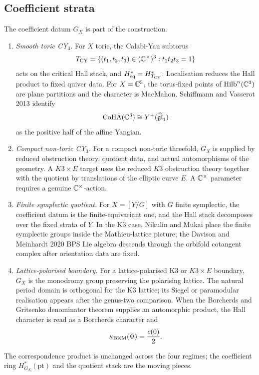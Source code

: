 \subsection*{Coefficient strata}

The coefficient datum $G_X$ is part of the construction.
\begin{enumerate}
\item \emph{Smooth toric CY$_3$.}
For $X$ toric, the Calabi-Yau subtorus
\[
  T_{\mathrm{CY}}
  =
  \{(t_1,t_2,t_3)\in(\mathbb{C}^\times)^3: t_1t_2t_3=1\}
\]
acts on the critical Hall stack, and
$H^{*}_{\mathrm{eq}} = H^{*}_{T_{\mathrm{CY}}}$.  Localisation reduces the Hall product
to fixed quiver data.  For $X=\mathbb{C}^3$, the torus-fixed points of
$\mathrm{Hilb}^{n}(\mathbb{C}^3)$ are plane partitions and the character is MacMahon.
Schiffmann and Vasserot 2013 identify
\[
  \mathrm{CoHA}(\mathbb{C}^3)
  \cong
  Y^{+}(\widehat{\mathfrak{gl}}_{1})
\]
as the positive half of the affine Yangian.

\item \emph{Compact non-toric CY$_3$.}
For a compact non-toric threefold, $G_X$ is supplied by reduced
obstruction theory, quotient data, and actual automorphisms of the
geometry.  A $K3 \times E$ target uses the reduced $K3$ obstruction
theory together with the quotient by translations of the elliptic curve
$E$.  A $\mathbb{C}^\times$ parameter requires a genuine $\mathbb{C}^\times$-action.

\item \emph{Finite symplectic quotient.}
For $X=[Y/G]$ with $G$ finite symplectic, the coefficient datum is the
finite-equivariant one, and the Hall stack decomposes over the fixed
strata of $Y$.  In the K3 case, Nikulin and Mukai place the finite
symplectic groups inside the Mathieu-lattice picture; the
Davison and Meinhardt 2020 BPS Lie algebra descends through the orbifold
cotangent complex after orientation data are fixed.

\item \emph{Lattice-polarised boundary.}
For a lattice-polarised K3 or $K3 \times E$ boundary, $G_X$ is the
monodromy group preserving the polarising lattice.  The natural period
domain is orthogonal for the K3 lattice; its Siegel or paramodular
realisation appears after the genus-two comparison.  When the
Borcherds and Gritsenko denominator theorem supplies an automorphic
product, the Hall character is read as a Borcherds character and
\[
  \kappa_{\mathrm{BKM}}(\Phi)=\frac{c(0)}{2}.
\]
\end{enumerate}
The correspondence product is unchanged across the four regimes; the
coefficient ring $H^{*}_{G_X}(\mathrm{pt})$ and the quotient stack are
the moving pieces.

